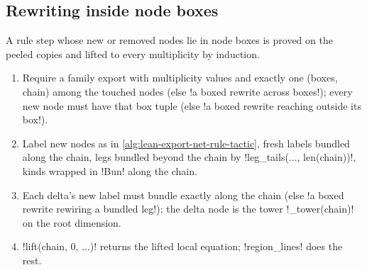 {\subsection{Rewriting inside node boxes}\label{sec:lean-export-net-lift}

A rule step whose new or removed nodes lie in node boxes is proved on the peeled copies and
lifted to every multiplicity by induction.

\begin{algorithm}\label{alg:lean-export-net-bundled}
\begin{enumerate}
\item Require a family export with multiplicity values and exactly one (boxes, chain) among the
  touched nodes (else \code!a boxed rewrite across boxes!); every new node must have that box
  tuple (else \code!a boxed rewrite reaching outside its box!).
\item Label new nodes as in \cref{alg:lean-export-net-rule-tactic}, fresh labels bundled along the
  chain, legs bundled beyond the chain by \py!leg_tails(..., len(chain))!, kinds wrapped in
  \code!Bun! along the chain.
\item Each delta's new label must bundle exactly along the chain (else
  \code!a boxed rewrite rewiring a bundled leg!); the delta node is the tower \py!_tower(chain)!
  on the root dimension.
\item \py!lift(chain, 0, ...)! returns the lifted local equation; \py!region_lines! does the rest.
\end{enumerate}
\end{algorithm}

}

